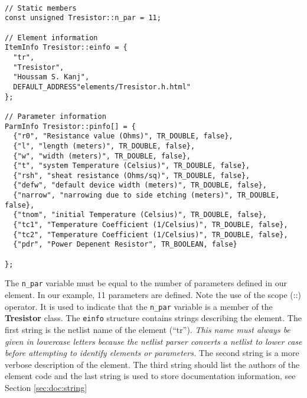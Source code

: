 \begin{lstlisting}[firstnumber=7, label={nonlinear:ssparm},
    caption={Static members and Parameter info of Tresistor.cc}]

// Static members
const unsigned Tresistor::n_par = 11;

// Element information
ItemInfo Tresistor::einfo = {
  "tr",
  "Tresistor",
  "Houssam S. Kanj",
  DEFAULT_ADDRESS"elements/Tresistor.h.html"
};

// Parameter information
ParmInfo Tresistor::pinfo[] = {
  {"r0", "Resistance value (Ohms)", TR_DOUBLE, false},
  {"l", "length (meters)", TR_DOUBLE, false},
  {"w", "width (meters)", TR_DOUBLE, false},
  {"t", "system Temperature (Celsius)", TR_DOUBLE, false},
  {"rsh", "sheat resistance (Ohms/sq)", TR_DOUBLE, false},
  {"defw", "default device width (meters)", TR_DOUBLE, false},
  {"narrow", "narrowing due to side etching (meters)", TR_DOUBLE, false},
  {"tnom", "initial Temperature (Celsius)", TR_DOUBLE, false},
  {"tc1", "Temperature Coefficient (1/Celsius)", TR_DOUBLE, false},
  {"tc2", "Temperature Coefficient (1/Celsius)", TR_DOUBLE, false},
  {"pdr", "Power Depenent Resistor", TR_BOOLEAN, false}

};
\end{lstlisting}

The \texttt{n\_par} variable must be equal to the number of
parameters defined in our element. In our example, 11 parameters
are defined. Note the use of the scope (::) operator. It is used to
indicate that the \texttt{n\_par} variable is a member of the
\textbf{Tresistor} class.  The \texttt{einfo} structure contains
strings describing the element. The first string is the netlist
name of the element (``tr''). \emph{This name must always be given in
lowercase letters because the \FDA netlist parser converts a netlist
to lower case before attempting to identify elements or parameters.}
The second string is a more verbose description of the element. The third
string should list the authors of the element code and the last
string is used to store documentation information, see Section \ref{sec:doc:string}

